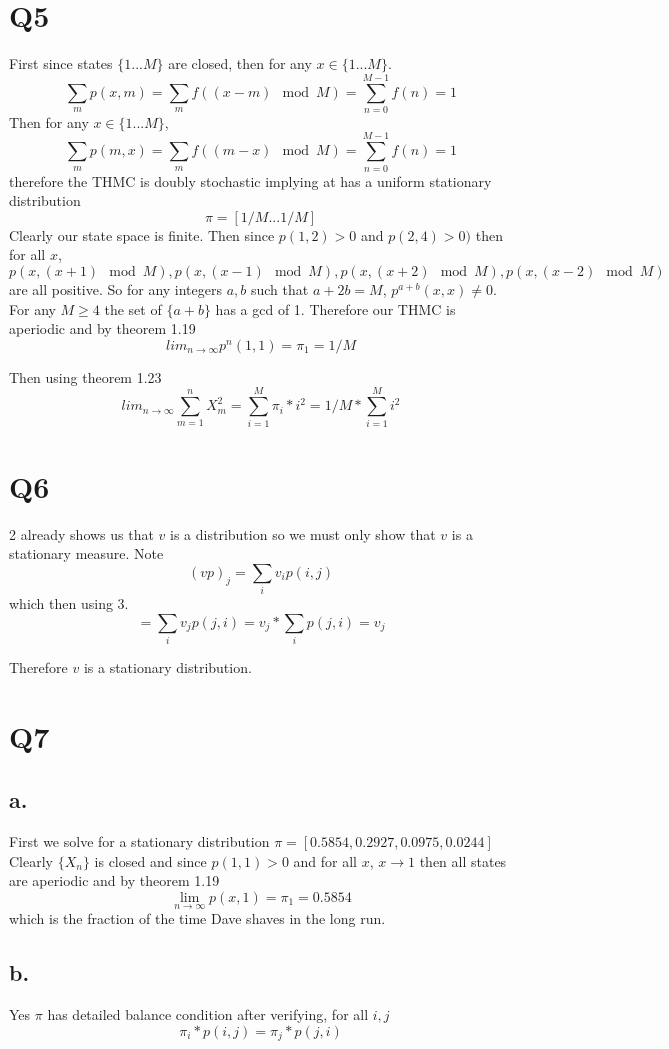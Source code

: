 \documentclass{article}
\begin{document}
\section*{Q5}
First since states $\{1 ... M \}$ are closed, then for any $x \in \{1 ... M\}$. 
\[
\sum_m p(x,m) = \sum_m f((x-m) \mod M) = \sum_{n = 0}^{M-1} f(n) = 1
\]
Then for any $x \in \{1 ... M\}$,
\[
\sum_m p(m,x) = \sum_m f((m-x) \mod M) = \sum_{n = 0}^{M-1} f(n) = 1
\]
therefore the THMC is doubly stochastic implying at has a uniform stationary distribution
\[
\pi = [1/M ... 1/M]
\]
Clearly our state space is finite. Then since $p(1,2) > 0$ and $p(2,4) > 0)$
then for all $x$, $p(x,(x+1) \mod M) , p(x, (x-1) \mod M), p(x, (x+2) \mod M) ,  p(x, (x-2) \mod M)$ are all positive. So for any integers $a,b$ such that $a + 2b = M$, $p^{a+b}(x,x) \neq 0$. For any $M \geq 4$ the set of $\{a+b\}$ has a gcd of 1. Therefore our THMC is aperiodic and by theorem 1.19
\[
lim_{n \to \infty} p^n(1,1) = \pi_1 = 1/M
\]

Then using theorem 1.23
\[
lim_{n \to \infty} \sum_{m = 1}^n X_m^2 = \sum_{i= 1} ^M \pi_i * i^2 = 1/M * \sum_{i = 1}^M i^2
\]

\section*{Q6}
2 already shows us that $v$ is a distribution so we must only show that $v$ is a stationary measure. 
Note
\[
(v p)_j = \sum_i v_ip(i,j)   
\]
which then using 3.
\[
 = \sum_i v_jp(j,i) = v_j * \sum_i p(j,i) = v_j
\]

Therefore $v$ is a stationary distribution.

\section*{Q7}
\subsection*{a.}
First we solve for a stationary distribution
$
\pi = [ 0.5854,  0.2927,  0.0975,  0.0244]
$
Clearly $\{X_n\}$ is closed and since $p(1,1) > 0$ and for all $x$, $x \rightarrow 1$ then all states are aperiodic and by theorem 1.19 
\[
\lim_{n \to \infty} p(x,1) = \pi_1 = 0.5854
\]
which is the fraction of the time Dave shaves in the long run.

\subsection*{b.}
Yes $\pi$ has detailed balance condition after verifying,
for all $i,j$
\[
\pi_i*p(i,j) = \pi_j*p(j,i)
\]
\end{document}
